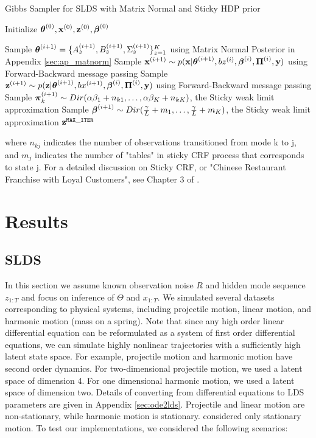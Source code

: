 \documentclass{article} %
\begin{document}
\begin{algorithm}[H]
\caption{Gibbs Sampler for SLDS with Matrix Normal and Sticky HDP prior}
\begin{algorithmic}[1]
\State Initialize $\boldsymbol{\theta}^{(0)}, {\bf x}^{(0)}, {\bf z}^{(0)}, \boldsymbol{\beta}^{(0)}$ 

\State
Sample $\boldsymbol{\theta}^{(i+1)} = \{A_{z}^{(i+1)}, B_{z}^{(i+1)}, \Sigma_{z}^{(i+1)} \}_{z=1}^K$ using Matrix Normal Posterior in Appendix \ref{sec:ap_matnorm} 
\State
Sample ${\bf x}^{(i+1)} \sim p({\bf x} | \boldsymbol{\theta}^{(i+1)}, bz^{(i)},  \boldsymbol{\beta}^{(i)}, \boldsymbol{\Pi}^{(i)}, {\bf y})$ using Forward-Backward message passing
\State
Sample ${\bf z}^{(i+1)} \sim p({\bf z} | \boldsymbol{\theta}^{(i+1)}, bx^{(i+1)}, \boldsymbol{\beta}^{(i)}, \boldsymbol{\Pi}^{(i)}, {\bf y})$ using Forward-Backward message passing
\State
Sample $\boldsymbol{\pi}_k^{(i+1)} \sim 
Dir(\alpha\beta_1 + n_{k1}, \dots, \alpha\beta_K + n_{kK})$, the Sticky weak limit approximation
\State
Sample $\boldsymbol{\beta}^{(i+1)} \sim 
Dir(\frac{\gamma}{L} + m_1, \dots, \frac{\gamma}{L} + m_K)$, the Sticky weak limit approximation
\EndFor
\State \Return ${\bf z}^{\tt MAX\_ITER}$
\EndProcedure
\end{algorithmic}
\end{algorithm}
where $n_{kj}$ indicates the number of observations transitioned from mode k to j, and $m_j$ indicates the number of "tables" in sticky CRF process that corresponds to state j. For a detailed discussion on Sticky CRF, or "Chinese Restaurant Franchise with Loyal Customers", see Chapter 3 of \citep{fox_bayesian_2009}.

\section{Results}

\subsection{SLDS} \label{sec:SLDS}
In this section we assume known observation noise $R$ and hidden mode sequence $z_{1:T}$ and focus on inference of $\Theta$ and $x_{1:T}$. We simulated several datasets corresponding to physical systems, including projectile motion, linear motion, and harmonic motion (mass on a spring). Note that since any high order linear differential equation can be reformulated as a system of first order differential equations, we can simulate highly nonlinear trajectories with a sufficiently high latent state space. For example, projectile motion and harmonic motion have second order dynamics. For two-dimensional projectile motion, we used a latent space of dimension 4. For one dimensional harmonic motion, we used a latent space of dimension two. Details of converting from differential equations to LDS parameters are given in Appendix \ref{sec:ode2lds}. Projectile and linear motion are non-stationary, while harmonic motion is stationary. \cite{fox_bayesian_2009} considered only stationary motion. To test our implementations, we considered the following scenarios:
\end{document}
